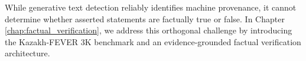 While generative text detection reliably identifies machine provenance, it cannot determine whether asserted statements are factually true or false. In Chapter \ref{chap:factual_verification}, we address this orthogonal challenge by introducing the Kazakh-FEVER 3K benchmark and an evidence-grounded factual verification architecture.

